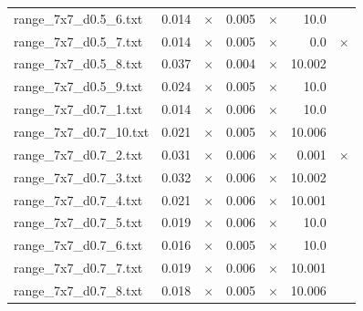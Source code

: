 \documentclass{article}
\begin{document}
\begin{center}
\begin{tabular}{lrrrrrr}
range\_7x7\_d0.5\_6.txt & 0.014 & 
$\times$
 & 0.005 & 
$\times$
 & 10.0 & 
\\
range\_7x7\_d0.5\_7.txt & 0.014 & 
$\times$
 & 0.005 & 
$\times$
 & 0.0 & 
$\times$
\\
range\_7x7\_d0.5\_8.txt & 0.037 & 
$\times$
 & 0.004 & 
$\times$
 & 10.002 & 
\\
range\_7x7\_d0.5\_9.txt & 0.024 & 
$\times$
 & 0.005 & 
$\times$
 & 10.0 & 
\\
range\_7x7\_d0.7\_1.txt & 0.014 & 
$\times$
 & 0.006 & 
$\times$
 & 10.0 & 
\\
range\_7x7\_d0.7\_10.txt & 0.021 & 
$\times$
 & 0.005 & 
$\times$
 & 10.006 & 
\\
range\_7x7\_d0.7\_2.txt & 0.031 & 
$\times$
 & 0.006 & 
$\times$
 & 0.001 & 
$\times$
\\
range\_7x7\_d0.7\_3.txt & 0.032 & 
$\times$
 & 0.006 & 
$\times$
 & 10.002 & 
\\
range\_7x7\_d0.7\_4.txt & 0.021 & 
$\times$
 & 0.006 & 
$\times$
 & 10.001 & 
\\
range\_7x7\_d0.7\_5.txt & 0.019 & 
$\times$
 & 0.006 & 
$\times$
 & 10.0 & 
\\
range\_7x7\_d0.7\_6.txt & 0.016 & 
$\times$
 & 0.005 & 
$\times$
 & 10.0 & 
\\
range\_7x7\_d0.7\_7.txt & 0.019 & 
$\times$
 & 0.006 & 
$\times$
 & 10.001 & 
\\
range\_7x7\_d0.7\_8.txt & 0.018 & 
$\times$
 & 0.005 & 
$\times$
 & 10.006 & 
\\
\hline\end{tabular}
\end{center}
\end{document}
